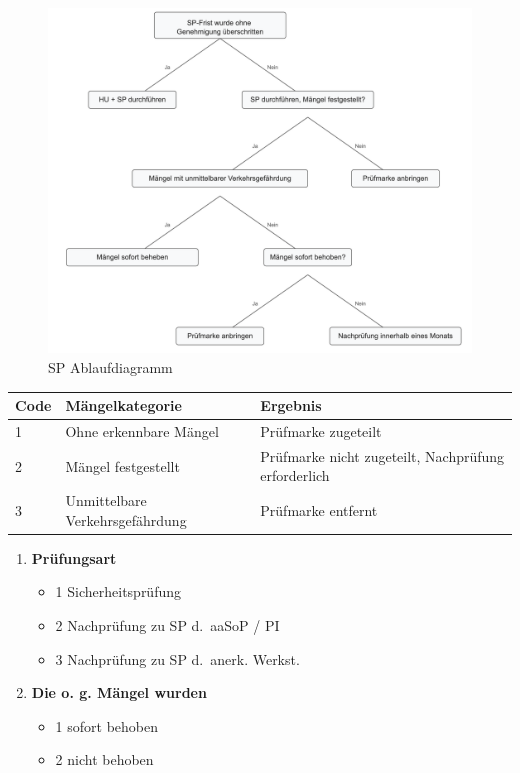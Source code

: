 \documentclass{vorlage-design-main}
\begin{document}
\begin{figure}
\centering
\includegraphics[width=0.8\linewidth,keepaspectratio]{images/SP-Ablaufdiagramm.png}
\caption{SP Ablaufdiagramm}
\end{figure}

\begin{table}[ht]
  \begin{tabular}{@{}lll@{}}
\toprule
Code
 &
Mängelkategorie
 &
Ergebnis
 \\
\midrule[\heavyrulewidth]
1 & Ohne erkennbare Mängel & Prüfmarke zugeteilt \\
2 & Mängel festgestellt & Prüfmarke nicht zugeteilt, Nachprüfung
erforderlich \\
3 & Unmittelbare Verkehrsgefährdung & Prüfmarke entfernt \\
\bottomrule
\end{tabular}%
\end{table}

\begin{enumerate}
\def\labelenumi{\arabic{enumi}.}

\item
  \textbf{Prüfungsart}

  \begin{itemize}

  \item
    1 Sicherheitsprüfung
  \item
    2 Nachprüfung zu SP d.~aaSoP / PI
  \item
    3 Nachprüfung zu SP d.~anerk. Werkst.
  \end{itemize}
\item
  \textbf{Die o. g. Mängel wurden}

  \begin{itemize}

  \item
    1 sofort behoben
  \item
    2 nicht behoben
  \end{itemize}
\end{enumerate}
\end{document}
